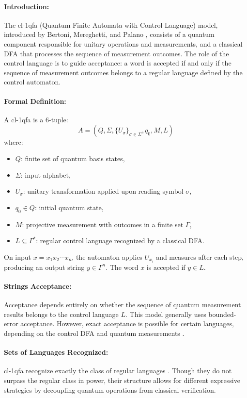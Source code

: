 \paragraph{Introduction:}  
The \gls{cl-1qfa} (Quantum Finite Automata with Control Language) model, introduced by Bertoni, Mereghetti, and Palano \cite{mereghetti2006quantum}, consists of a quantum component responsible for unitary operations and measurements, and a classical DFA that processes the sequence of measurement outcomes. The role of the control language is to guide acceptance: a word is accepted if and only if the sequence of measurement outcomes belongs to a regular language defined by the control automaton.

\paragraph{Formal Definition:}  
A \gls{cl-1qfa} is a 6-tuple:
\[
A = (Q, \Sigma, \{U_\sigma\}_{\sigma \in \Sigma}, q_0, M, L)
\]
where:
\begin{itemize}
    \item $Q$: finite set of quantum basis states,
    \item $\Sigma$: input alphabet,
    \item $U_\sigma$: unitary transformation applied upon reading symbol $\sigma$,
    \item $q_0 \in Q$: initial quantum state,
    \item $M$: projective measurement with outcomes in a finite set $\Gamma$,
    \item $L \subseteq \Gamma^*$: regular control language recognized by a classical DFA.
\end{itemize}
On input $x = x_1x_2\cdots x_n$, the automaton applies $U_{x_i}$ and measures after each step, producing an output string $y \in \Gamma^n$. The word $x$ is accepted if $y \in L$.

\paragraph{Strings Acceptance:}  
Acceptance depends entirely on whether the sequence of quantum measurement results belongs to the control language $L$. This model generally uses bounded-error acceptance. However, exact acceptance is possible for certain languages, depending on the control DFA and quantum measurements \cite{mereghetti2006quantum}.

\paragraph{Sets of Languages Recognized:}  
\gls{cl-1qfa} recognize exactly the class of regular languages \cite{li2015hybrid}. Though they do not surpass the regular class in power, their structure allows for different expressive strategies by decoupling quantum operations from classical verification.

